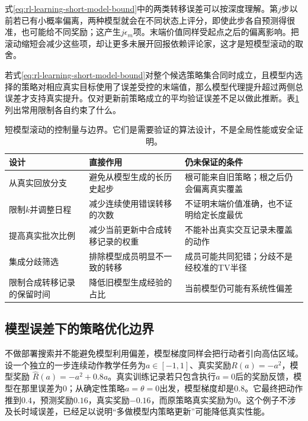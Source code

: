 式\eqref{eq:rl-learning-short-model-bound}中的两类转移误差可以按深度理解。第$j$步以前若已有小概率偏离，两种模型就会在不同状态上评分，即使此步各自预测得很准，也可能给不同奖励；这产生$j\epsilon_m$项。末端价值同样受起点之后的偏离影响。把滚动缩短会减少这些项，却让更多未展开回报依赖评论家，这才是短模型滚动的取舍。

若式\eqref{eq:rl-learning-short-model-bound}对整个候选策略集合同时成立，且模型内选择的策略对相应真实目标使用了误差受控的末端值，那么模型代理提升超过两侧总误差才支持真实提升。仅对更新前策略成立的平均验证误差不足以做此推断。表\ref{tab:rl-learning-rollout-controls}列出常用限制各自约束了什么。

\begin{table}[t]
  \centering
  \small
  \begin{tabularx}{\linewidth}{>{\raggedright\arraybackslash}p{25mm} >{\raggedright\arraybackslash}X >{\raggedright\arraybackslash}X}
    \toprule
    设计 & 直接作用 & 仍未保证的条件 \\
    \midrule
    从真实回放分支 & 避免从模型生成的长历史起步 & 根可能来自旧策略；根之后仍会偏离真实覆盖 \\
    限制$k$并调整日程 & 减少连续使用错误转移的次数 & 不证明末端价值准确，也不证明给定长度最优 \\
    提高真实批次比例 & 减少当前更新中合成转移记录的权重 & 不能补出真实交互记录未覆盖的动作 \\
    集成分歧筛选 & 排除模型成员明显不一致的转移 & 成员可能共同犯错；分歧不是经校准的TV半径 \\
    限制合成转移记录的保留时间 & 降低旧模型生成经验的占比 & 当前模型仍可能有系统性偏差 \\
    \bottomrule
  \end{tabularx}
  \caption{短模型滚动的控制量与边界。它们是需要验证的算法设计，不是全局性能或安全证明。}
  \label{tab:rl-learning-rollout-controls}
\end{table}

\subsection{模型误差下的策略优化边界}
\label{sec:rl-learning-model-policy-boundary}

不做部署搜索并不能避免模型利用偏差，模型梯度同样会把行动者引向高估区域。设一个独立的一步连续动作教学任务为$a\in[-1,1]$、真实奖励$R(a)=-a^2$，模型奖励
$\widehat R(a)=-a^2+0.8a$。真实训练记录若只包含执行$a=0$后的奖励反馈，模型在那里误差为0；从确定性策略$a=\theta=0$出发，模型梯度却是$0.8$。它最终把动作推到$0.4$，预测奖励$0.16$，真实奖励$-0.16$，而原策略真实奖励为0。这个例子不涉及长时域误差，已经足以说明“多做模型内策略更新”可能降低真实性能。

